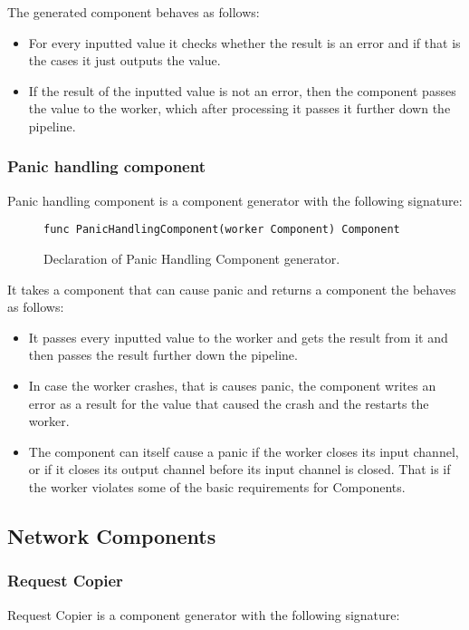 \documentclass[12pt,a4paper]{article}
\begin{document}
The generated component behaves as follows:
\begin{itemize}
	\item For every inputted value it checks whether the result is an error
				and if that is the cases it just outputs the value.
	\item If the result of the inputted value is not an error, then the component
				passes the value to the worker, which after processing it passes 
				it further down the pipeline.
\end{itemize}

\subsubsection{Panic handling component}
Panic handling component is a component generator with the following signature:

\begin{figure}[h]
\centering
\begin{lstlisting}
func PanicHandlingComponent(worker Component) Component
\end{lstlisting}
\caption[scale=1.0]{Declaration of Panic Handling Component generator.}
\label{fig:panicHandler}
\end{figure}

It takes a component that can cause panic and returns a component the behaves as follows:
\begin{itemize}
	\item It passes every inputted value to the worker and gets the result from it and then passes
				the result further down the pipeline.
	\item In case the worker crashes, that is causes panic, the component writes an error as a result 
				for the value that caused the crash and the restarts the worker.
	\item The component can itself cause a panic if the worker closes its input channel, or if 
				it closes its output channel before its input channel is closed. That is if the worker
				violates some of the basic requirements for Components.
\end{itemize}

\subsection{Network Components}
\subsubsection{Request Copier}
Request Copier is a component generator with the following signature:
\end{document}
